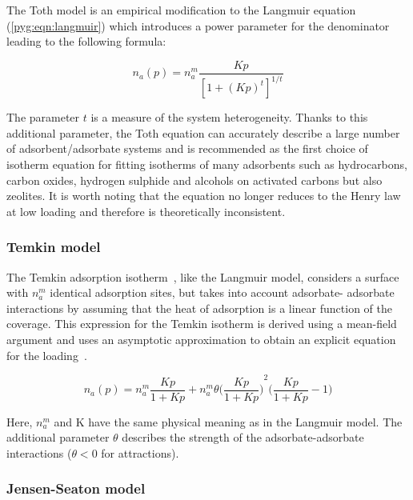 The Toth model is an empirical modification to the Langmuir equation
(\ref{pyg:eqn:langmuir})
which introduces a power parameter for the denominator leading to
the following formula:

\begin{equation}\label{pyg:eqn:toth}
    n_a(p) = n_a^m \frac{K p}{{[1 + {(K p)}^t]}^{1/t}}
\end{equation}

The parameter \(t\) is a measure of the system heterogeneity. Thanks to this
additional parameter, the Toth equation can accurately describe a
large number of adsorbent/adsorbate systems and is recommended as the first
choice of isotherm equation for fitting isotherms of many adsorbents such as
hydrocarbons, carbon oxides, hydrogen sulphide and alcohols on activated carbons
but also zeolites.
It is worth noting that the equation no longer reduces to the Henry law 
at low loading and therefore is theoretically inconsistent.


\subsubsection{Temkin model}\label{pyg:models:temkin}

The Temkin adsorption isotherm~\cite{temkinKineticsAmmoniaSynthesis1940}, 
like the Langmuir model, considers
a surface with \(n_a^m\) identical adsorption sites, but takes into account adsorbate-
adsorbate interactions by assuming that the heat of adsorption is a linear
function of the coverage. This expression for the Temkin isotherm is derived
using a mean-field argument and uses an asymptotic approximation
to obtain an explicit equation for the 
loading~\cite{simonOptimizingNanoporousMaterials2014}.

\begin{equation}\label{pyg:eqn:temkin}
    n_a(p) = n_a^m \frac{Kp}{1+Kp} + n_a^m \theta 
    {\Big(\frac{Kp}{1+Kp}\Big)}^2 \Big(\frac{Kp}{1+Kp} -1\Big)
\end{equation}

Here, \(n_a^m\) and K have the same physical meaning as in the Langmuir model.
The additional parameter \(\theta\) describes the strength of the adsorbate-adsorbate
interactions (\(\theta < 0\) for attractions).

\subsubsection{Jensen-Seaton model}\label{pyg:models:jseaton}

